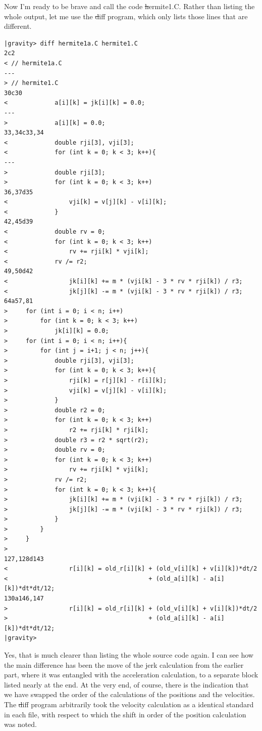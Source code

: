 \bob
Now I'm ready to be brave and call the code {\st hermite1.C}.  Rather
than listing the whole output, let me use the {\st diff} program,
which only lists those lines that are different.

\cba

\begin{small}
\begin{verbatim}
|gravity> diff hermite1a.C hermite1.C
2c2
< // hermite1a.C
---
> // hermite1.C
30c30
<             a[i][k] = jk[i][k] = 0.0;
---
>             a[i][k] = 0.0;
33,34c33,34
<             double rji[3], vji[3];
<             for (int k = 0; k < 3; k++){
---
>             double rji[3];
>             for (int k = 0; k < 3; k++)
36,37d35
<                 vji[k] = v[j][k] - v[i][k];
<             }
42,45d39
<             double rv = 0;
<             for (int k = 0; k < 3; k++)
<                 rv += rji[k] * vji[k];
<             rv /= r2;
49,50d42
<                 jk[i][k] += m * (vji[k] - 3 * rv * rji[k]) / r3;
<                 jk[j][k] -= m * (vji[k] - 3 * rv * rji[k]) / r3;
64a57,81
>     for (int i = 0; i < n; i++)
>         for (int k = 0; k < 3; k++)
>             jk[i][k] = 0.0;
>     for (int i = 0; i < n; i++){
>         for (int j = i+1; j < n; j++){
>             double rji[3], vji[3];
>             for (int k = 0; k < 3; k++){
>                 rji[k] = r[j][k] - r[i][k];
>                 vji[k] = v[j][k] - v[i][k];
>             }
>             double r2 = 0;
>             for (int k = 0; k < 3; k++)
>                 r2 += rji[k] * rji[k];
>             double r3 = r2 * sqrt(r2);
>             double rv = 0;
>             for (int k = 0; k < 3; k++)
>                 rv += rji[k] * vji[k];
>             rv /= r2;
>             for (int k = 0; k < 3; k++){
>                 jk[i][k] += m * (vji[k] - 3 * rv * rji[k]) / r3;
>                 jk[j][k] -= m * (vji[k] - 3 * rv * rji[k]) / r3;
>             }
>         }
>     }
> 
127,128d143
<                 r[i][k] = old_r[i][k] + (old_v[i][k] + v[i][k])*dt/2
<                                       + (old_a[i][k] - a[i][k])*dt*dt/12;
130a146,147
>                 r[i][k] = old_r[i][k] + (old_v[i][k] + v[i][k])*dt/2
>                                       + (old_a[i][k] - a[i][k])*dt*dt/12;
|gravity>
\end{verbatim}
\end{small}

\abc

\carol
Yes, that is much clearer than listing the whole source code again.
I can see how the main difference has been the move of the jerk
calculation from the earlier part, where it was entangled with the
acceleration calculation, to a separate block listed nearly at the
end.  At the very end, of course, there is the indication that we have
swapped the order of the calculations of the positions and the velocities.
The {\st diff} program arbitrarily took the velocity calculation as a
identical standard in each file, with respect to which the shift in
order of the position calculation was noted.

